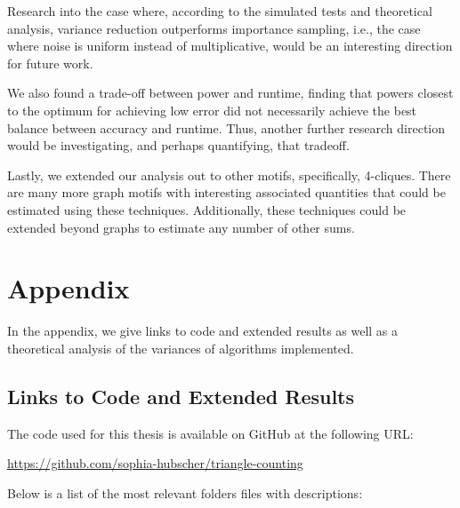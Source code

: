 \documentclass[11pt, margin=1in]{article}
\begin{document}
Research into the case where, according to the simulated tests and theoretical analysis, variance reduction outperforms importance sampling, i.e., the case where noise is uniform instead of multiplicative, would be an interesting direction for future work.

We also found a trade-off between power and runtime, finding that powers closest to the optimum for achieving low error did not necessarily achieve the best balance between accuracy and runtime.
Thus, another further research direction would be investigating, and perhaps quantifying, that tradeoff.

Lastly, we extended our analysis out to other motifs, specifically, 4-cliques.
There are many more graph motifs with interesting associated quantities that could be estimated using these techniques.
Additionally, these techniques could be extended beyond graphs to estimate any number of other sums.

\newpage




\newpage

\section{Appendix}

In the appendix, we give links to code and extended results as well as a theoretical analysis of the variances of algorithms implemented.

\subsection{Links to Code and Extended Results}

The code used for this thesis is available on GitHub at the following URL:

\url{https://github.com/sophia-hubscher/triangle-counting}

Below is a list of the most relevant folders files with descriptions:
\end{document}
